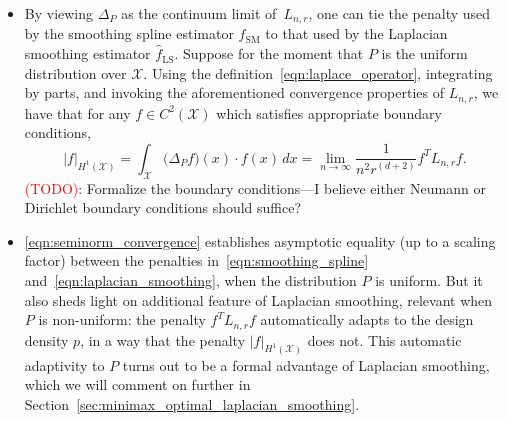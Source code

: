 \documentclass{article}
\newcommand{\abs}[1]{\left \lvert #1 \right \rvert}
\newcommand{\1}{\mathbf{1}}
\newcommand{\Lap}{L}
\newcommand{\Xset}{\mathcal{X}}
\newcommand{\wh}[1]{\widehat{#1}}
\newcommand{\LS}{\mathrm{LS}}
\newcommand{\SM}{\mathrm{SM}}
\theoremstyle{alden}
\theoremstyle{aldenthm}
\theoremstyle{definition}
\theoremstyle{remark}
\begin{document}
\begin{itemize}
	\item By viewing $\Delta_P$ as the continuum limit of~$\Lap_{n,r}$, one can tie the penalty used by the smoothing spline estimator $\wh{f}_{\SM}$ to that used by the Laplacian smoothing estimator $\wh{f}_{\LS}$. Suppose for the moment that $P$ is the uniform distribution over $\Xset$. Using the definition~\eqref{eqn:laplace_operator}, integrating by parts, and invoking the aforementioned convergence properties of $\Lap_{n,r}$, we have that for any $f \in C^{2}(\Xset)$ which satisfies appropriate boundary conditions,
	\begin{equation}
	\label{eqn:seminorm_convergence}
	\abs{f}_{H^1(\Xset)} = \int_{\Xset} \bigl(\Delta_P f\bigr)(x) \cdot f(x) \,dx = \lim_{n \to \infty} \frac{1}{n^{2}r^{(d + 2)}}f^T \Lap_{n,r} f.
	\end{equation}
	\textcolor{red}{(TODO)}: Formalize the boundary conditions---I believe either Neumann or Dirichlet boundary conditions should suffice?
	\item \eqref{eqn:seminorm_convergence} establishes asymptotic equality (up to a scaling factor) between the penalties in~\eqref{eqn:smoothing_spline} and~\eqref{eqn:laplacian_smoothing}, when the distribution $P$ is uniform. But it also sheds light on additional feature of Laplacian smoothing, relevant when $P$ is non-uniform: the penalty $f^T \Lap_{n,r} f$ automatically adapts to the design density $p$, in a way that the penalty $|f|_{H^1(\Xset)}$ does not. This automatic adaptivity to $P$ turns out to be a formal advantage of Laplacian smoothing, which we will comment on further in Section~\ref{sec:minimax_optimal_laplacian_smoothing}.
\end{itemize}
\end{document}
